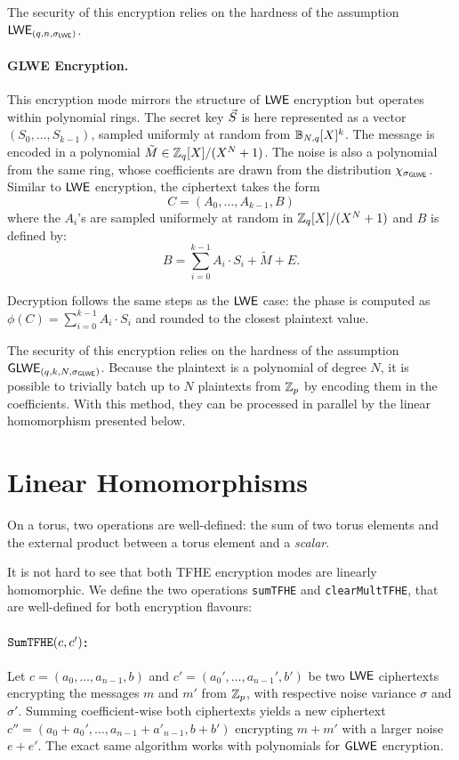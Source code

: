 The security of this encryption relies on the hardness of the assumption $\textsf{LWE}_{(q, n, \sigma_{\textsf{LWE}})}$. 



\paragraph{GLWE Encryption.} This encryption mode mirrors the structure of $\textsf{LWE}$ encryption but operates within polynomial rings. The secret key $\vec S$ is here represented as a vector $(S_0, \dots, S_{k-1})$, sampled uniformly at random from $\mathbb{B}_{N, q}[X]^k$. 
%
The message is encoded in a polynomial $\tilde M \in \mathbb{Z}_q[X] / (X^N + 1)$. The noise is also a polynomial from the same ring, whose coefficients are drawn from the distribution $\chi_{\sigma_{\textsf{GLWE}}}$.
%
Similar to $\textsf{LWE}$ encryption, the ciphertext takes the form \[C = (A_0, \dots, A_{k-1}, B)\] where the $A_i$'s are sampled uniformely at random in $\mathbb{Z}_q[X] / (X^N + 1)$ and $B$ is defined by: \[B = \sum_{i=0}^{k-1} A_i \cdot S_i + \tilde M + E.\]
%

Decryption follows the same steps as the $\textsf{LWE}$ case: the phase is computed as $\phi(C) = \sum_{i=0}^{k-1} A_i \cdot S_i$ and rounded to the closest plaintext value.


The security of this encryption relies on the hardness of the assumption $\textsf{GLWE}_{(q, k, N, \sigma_{\textsf{GLWE}})}$. Because the plaintext is a polynomial of degree $N$, it is possible to trivially batch up to $N$ plaintexts from $\mathbb{Z}_p$ by encoding them in the coefficients. With this method, they can be processed in parallel by the linear homomorphism presented below.




\section{Linear Homomorphisms}

On a torus, two operations are well-defined: the sum of two torus elements and the external product between a torus element and a \textit{scalar}.

It is not hard to see that both TFHE encryption modes are linearly homomorphic. We define the two operations \texttt{sumTFHE} and \texttt{clearMultTFHE}, that are well-defined for both encryption flavours:


\paragraph{$\texttt{SumTFHE}(c, c')$:} Let $c = (a_0, \dots, a_{n-1}, b)$ and $c' = (a_0', \dots, a_{n-1}', b')$ be two $\textsf{LWE}$ ciphertexts encrypting the messages $m$ and $m'$ from $\mathbb{Z}_p$, with respective noise variance $\sigma$ and $\sigma'$. Summing coefficient-wise both ciphertexts yields a new ciphertext $c'' = (a_0 + a_0', \dots, a_{n-1} + a'_{n-1}, b + b')$ encrypting $m + m'$ with a larger noise $e + e'$. The exact same algorithm works with polynomials for $\textsf{GLWE}$ encryption. 


